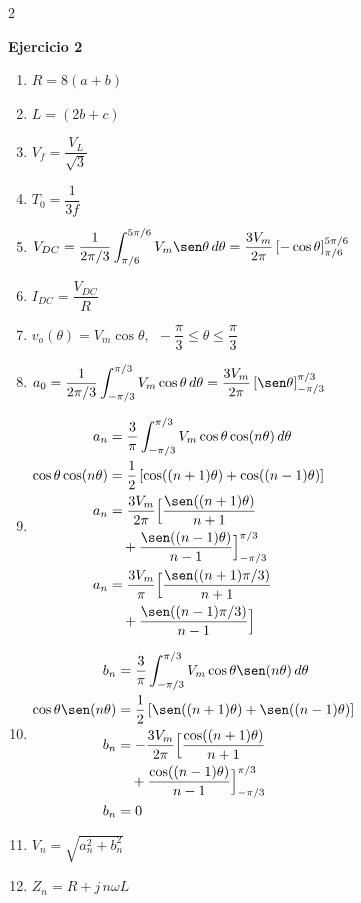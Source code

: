 \documentclass[9pt]{extarticle}
\begin{document}
\begin{multicols}{2}

\textbf{Ejercicio 2}

\begin{enumerate}
\item $R = 8(a+b)$
\item $L = (2b+c)$
\item $V_f = \dfrac{V_L}{\sqrt{3}}$
\item $T_0 = \dfrac{1}{3f}$
\item $V_{DC} = \dfrac{1}{2\pi/3}\displaystyle\int_{\pi/6}^{5\pi/6} V_m\sen\theta\,d\theta = \dfrac{3V_m}{2\pi}\left[-\cos\theta\right]_{\pi/6}^{5\pi/6}$
\item $I_{DC} = \dfrac{V_{DC}}{R}$
\item $v_o(\theta) = V_m\cos\theta,\ \ -\dfrac{\pi}{3}\le\theta\le\dfrac{\pi}{3}$
\item $a_0 = \dfrac{1}{2\pi/3}\displaystyle\int_{-\pi/3}^{\pi/3} V_m\cos\theta\,d\theta = \dfrac{3V_m}{2\pi}\left[\sen\theta\right]_{-\pi/3}^{\pi/3}$
\item $\begin{aligned}
a_n &= \dfrac{3}{\pi}\displaystyle\int_{-\pi/3}^{\pi/3} V_m\cos\theta\cos(n\theta)\,d\theta \\
\cos\theta\cos(n\theta) &= \dfrac{1}{2}\left[\cos((n+1)\theta)+\cos((n-1)\theta)\right] \\
a_n &= \dfrac{3V_m}{2\pi}\Big[\dfrac{\sen((n+1)\theta)}{n+1} \\
&\quad +\dfrac{\sen((n-1)\theta)}{n-1}\Big]_{-\pi/3}^{\pi/3} \\
a_n &= \dfrac{3V_m}{\pi}\Big[\dfrac{\sen((n+1)\pi/3)}{n+1} \\
&\quad +\dfrac{\sen((n-1)\pi/3)}{n-1}\Big]
\end{aligned}$
\item $\begin{aligned}
b_n &= \dfrac{3}{\pi}\displaystyle\int_{-\pi/3}^{\pi/3} V_m\cos\theta\sen(n\theta)\,d\theta \\
\cos\theta\sen(n\theta) &= \dfrac{1}{2}\left[\sen((n+1)\theta)+\sen((n-1)\theta)\right] \\
b_n &= -\dfrac{3V_m}{2\pi}\Big[\dfrac{\cos((n+1)\theta)}{n+1} \\
&\quad +\dfrac{\cos((n-1)\theta)}{n-1}\Big]_{-\pi/3}^{\pi/3} \\
b_n &= 0
\end{aligned}$
\item $V_n = \sqrt{a_n^2 + b_n^2}$
\item $Z_n = R + j\,n\omega L$

\end{enumerate}
\end{multicols}
\end{document}
